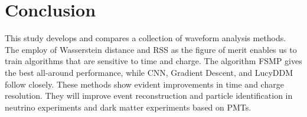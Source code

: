 \section{Conclusion}
\label{sec:conclusion}

This study develops and compares a collection of waveform analysis methods. The employ of Wasserstein distance and RSS as the figure of merit enables us to train algorithms that are sensitive to time and charge. The algorithm FSMP gives the best all-around performance, while CNN, Gradient Descent, and LucyDDM follow closely. These methods show evident improvements in time and charge resolution. They will improve event reconstruction and particle identification in neutrino experiments and dark matter experiments based on PMTs. 